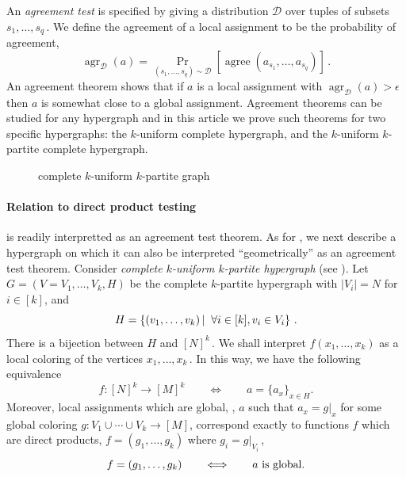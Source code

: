 \documentclass{toc}
\newcommand{\Prob}[2][]{\Pr_{{#1}}\left[#2\right]} %
\newcommand{\abs}[1]{\lvert#1\rvert} %
\newcommand\sett[2]{\left\{ #1 \left| \; \vphantom{#1 #2} \right. #2  \right\}} %
\newcommand{\set}[1]{\{#1\}} %
\DeclareMathOperator*{\agree}{agree} %
\DeclareMathOperator*{\agrx}{agr} %
\begin{document}
An \emph{agreement test} is specified by giving a distribution $\mathcal{D}$ over tuples of subsets $s_1,\ldots,s_q$\,. We define the agreement of a local assignment to be the probability of agreement,
\[ \agrx_\mathcal{D}(a) = \Prob[(s_1,\ldots,s_q)\sim \mathcal{D}]{ \agree(a_{s_1},\ldots, a_{s_q}) }\,. %
\]
%
An agreement theorem shows that if $a$ is a local assignment with $\agrx_\mathcal{D}(a) > \epsilon$ then $a$ is somewhat close to a global assignment. Agreement theorems can be studied for any hypergraph and in this
%
article  %
we prove such theorems for two specific hypergraphs: the $k$-uniform complete hypergraph, and the $k$-uniform $k$-partite complete hypergraph.
{
	\begin{figure}
		\caption{complete $k$-uniform $k$-partite graph}
		\label{fig:partite}
		\centering
	\end{figure}}
	
\paragraph*{Relation to direct product testing}
 is readily interpretted as an agreement test theorem. As for , we next describe a hypergraph on which it can also be interpreted ``geometrically'' as an agreement test theorem. Consider \emph{complete $k$-uniform $k$-partite hypergraph} (see ).
Let $G = (V=V_1,\ldots, V_k, H)$ be the complete $k$-partite hypergraph with $\abs{V_i}=N$ for $i\in[k]$, and
\[ H = \sett{(v_1,\ldots, v_k)}{\forall i\in [k], v_i\in V_i}\,. \] %
There is a bijection between $H$ and $[N]^k$\,. We shall interpret $f(x_1,\ldots,x_k)$ as a local coloring of the vertices $x_1,\ldots,x_k$\,. In this way, we have the following equivalence
\[ f:[N]^k\to[M]^k \qquad \Longleftrightarrow \qquad a = \set{a_x}_{x\in H}.
\]
Moreover, local assignments which are global, \ie, $a$ such that $a_x = g|_x$ for some global coloring  $g:V_1\cup\cdots\cup V_k\to[M]$, correspond exactly to functions $f$ which are direct products, $f=(g_1,\ldots,g_k)$ where $g_i = g|_{V_i}$\,,
\[ f=(g_1,\ldots,g_k) \qquad \Longleftrightarrow \qquad a \hbox{ is global}. %
\]
	
\end{document}
